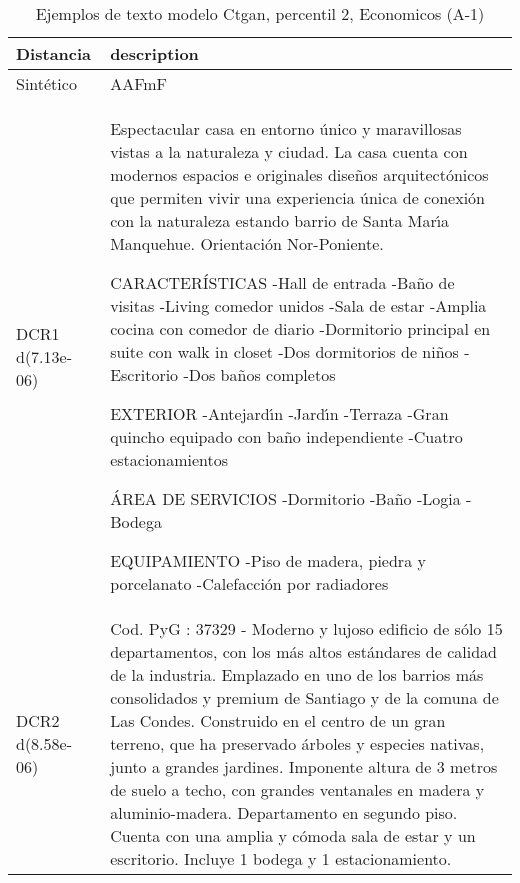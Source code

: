 \begin{table}[H]
\centering
\fontsize{10}{14}\selectfont
\caption{Ejemplos de texto modelo Ctgan, percentil 2, Economicos (A-1)}
\label{table-example-economicos-a-1-ctgan-2p-text}
\begin{tabular}{|l|m{35em}|}
\hline
\rowcolor[gray]{0.8}
Distancia & description \\
\hline Sintético & AAFmF \\
\hline DCR1 d(7.13e-06) & Espectacular casa en entorno \'unico y maravillosas vistas a la naturaleza y ciudad. 
La casa cuenta con modernos espacios e originales dise\~nos arquitect\'onicos que permiten vivir una experiencia \'unica de conexi\'on con la naturaleza estando barrio de Santa Mar{\'\i}a Manquehue. 
Orientaci\'on Nor-Poniente.

CARACTER\'ISTICAS
-Hall de entrada 
-Ba\~no de visitas 
-Living comedor unidos 
-Sala de estar
-Amplia cocina con comedor de diario 
-Dormitorio principal en suite con walk in closet 
-Dos dormitorios de ni\~nos 
-Escritorio 
-Dos ba\~nos completos 

EXTERIOR 
-Antejard{\'\i}n 
-Jard{\'\i}n 
-Terraza 
-Gran quincho equipado con ba\~no independiente
-Cuatro estacionamientos 

\'AREA DE SERVICIOS 
-Dormitorio 
-Ba\~no 
-Logia 
-Bodega 

EQUIPAMIENTO 
-Piso de madera, piedra y porcelanato 
-Calefacci\'on por radiadores \\
\hline DCR2 d(8.58e-06) & Cod. PyG : 37329 - Moderno y lujoso edificio de s\'olo 15 departamentos, con los m\'as altos est\'andares de calidad de la industria. Emplazado en uno de los barrios m\'as consolidados y premium de Santiago y de la comuna de Las Condes. Construido en el centro de un gran terreno, que ha preservado \'arboles y especies nativas, junto a grandes jardines. Imponente altura de 3 metros de suelo a techo, con grandes ventanales en madera y aluminio-madera. Departamento en segundo piso. Cuenta con una amplia y c\'omoda sala de estar y un escritorio. Incluye 1 bodega y 1 estacionamiento. \\
\hline
\end{tabular}
\end{table}

